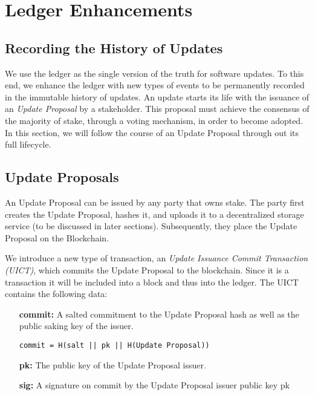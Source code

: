 \section{Ledger Enhancements}

\subsection*{Recording the History of Updates}
We use the ledger as the single version of the truth for software updates. To this end, we enhance the ledger with new types of events to be permanently recorded in the immutable history of updates. An update starts its life with the issuance of an \emph{Update Proposal} by a stakeholder. This proposal must achieve the consensus of the majority of stake, through a voting mechanism, in order to become adopted. In this section, we will follow the course of an Update Proposal through out its full lifecycle.


\subsection*{Update Proposals}
An Update Proposal can be issued by any party that owns stake. The party first creates the Update Proposal, hashes it, and uploads it to a decentralized storage service (to be discussed in later sections). Subsequently, they place the Update Proposal on the Blockchain.

We introduce a new type of transaction, an \emph{Update Issuance Commit Transaction (UICT)}, which commits the Update Proposal to the blockchain. Since it is a transaction it will be included into a block and thus into the ledger. The UICT contains the following data:

\begin{itemize}
\item[\textbf{commit:}] A salted commitment to the Update Proposal hash as well as the public saking key of the issuer. 
\begin{verbatim}
commit = H(salt || pk || H(Update Proposal))
\end{verbatim}
\item[\textbf{pk:}] The public key of the Update Proposal issuer.
\item[\textbf{sig:}] A signature on commit by the Update Proposal issuer public key pk
\end{itemize}

